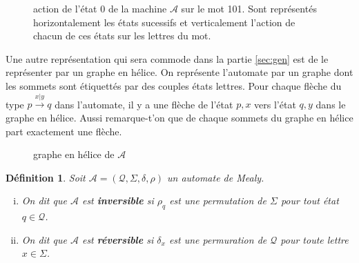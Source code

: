 \documentclass[11pt,a4paper]{article}
\newtheorem{definition}{Définition}
\begin{document}
\begin{figure}[h]
  \begin{center}
    \caption{action de l'état 0 de la machine $\mathcal{A}$ sur le mot 101. Sont représentés horizontalement les états sucessifs et verticalement l'action de chacun de ces états sur les lettres du mot.}
  \end{center}
\end{figure}

Une autre représentation qui sera commode dans la partie \ref{sec:gen} est de le représenter par un graphe en hélice. On représente l'automate par un graphe dont les sommets sont étiquettés par des couples états lettres. Pour chaque flèche du type $p\overset{x|y}{\longrightarrow}q$ dans l'automate, il y a une flèche de l'état $p, x$ vers l'état $q, y$ dans le graphe en hélice. Aussi remarque-t'on que de chaque sommets du graphe en hélice part exactement une flèche.

\begin{figure}[h]
  \begin{center}
    \caption{graphe en hélice de $\mathcal{A}$}
  \end{center}
\end{figure}

\begin{definition}
  Soit $\mathcal{A}=\left(\mathcal{Q}, \Sigma, \delta, \rho\right)$ un automate de Mealy.
  \begin{enumerate}[(i)]
  \item On dit que $\mathcal{A}$ est \textbf{inversible} si $\rho_q$ est une permutation de $\Sigma$ pour tout état $q\in\mathcal{Q}$.
  \item On dit que $\mathcal{A}$ est \textbf{réversible} si $\delta_x$ est une permuration de $\mathcal{Q}$ pour toute lettre $x\in\Sigma$.
  \end{enumerate}
\end{definition}
\end{document}
